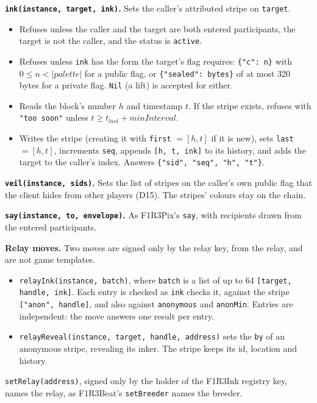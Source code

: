 \documentclass[11pt,a4paper]{article}
\newcommand{\code}[1]{\texttt{#1}}
\newcounter{req}
\begin{document}
\textbf{\code{ink(instance, target, ink)}.} Sets the caller's attributed stripe on
\code{target}.
\begin{itemize}[leftmargin=1.2em,itemsep=1pt]
\item Refuses unless the caller and the target are both entered participants, the target is not
  the caller, and the status is \code{active}.
\item Refuses unless \code{ink} has the form the target's flag requires: \code{\{"c": n\}} with
  $0\le n<|\mathit{palette}|$ for a public flag, or \code{\{"sealed": bytes\}} of at most 320
  bytes for a private flag. \code{Nil} (a lift) is accepted for either.
\item Reads the block's number $h$ and timestamp $t$. If the stripe exists, refuses with
  \code{"too soon"} unless $t \ge t_{\mathit{last}} + \mathit{minInterval}$.
\item Writes the stripe (creating it with \code{first} $=[h, t]$ if it is new), sets
  \code{last} $=[h,t]$, increments \code{seq}, appends \code{[h, t, ink]} to its history, and adds
  the target to the caller's index. Answers \code{\{"sid", "seq", "h", "t"\}}.
\end{itemize}

\textbf{\code{veil(instance, sids)}.} Sets the list of stripes on the caller's own public flag
that the client hides from other players (D15). The stripes' colours stay on the chain.

\textbf{\code{say(instance, to, envelope)}.} As F1R3Pix's \code{say}, with recipients drawn
from the entered participants.

\textbf{Relay moves.} Two moves are signed only by the relay key, from the relay, and are not
game templates.
\begin{itemize}[leftmargin=1.2em,itemsep=1pt]
\item \code{relayInk(instance, batch)}, where \code{batch} is a list of up to 64
  \code{[target, handle, ink]}. Each entry is checked as \code{ink} checks it, against the
  stripe \code{["anon", handle]}, and also against \code{anonymous} and \code{anonMin}. Entries
  are independent: the move answers one result per entry.
\item \code{relayReveal(instance, target, handle, address)} sets the \code{by} of an anonymous
  stripe, revealing its inker. The stripe keeps its id, location and history.
\end{itemize}
\code{setRelay(address)}, signed only by the holder of the F1R3Ink registry key, names the
relay, as F1R3Beat's \code{setBreeder} names the breeder.
\end{document}
